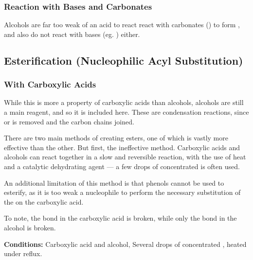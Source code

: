 
			\subsubsection{Reaction with Bases and Carbonates}

				Alcohols are far too weak of an acid to react react with carbonates () to form , and also do not
				react with bases (eg. ) either.



		\subsection{Esterification (Nucleophilic Acyl Substitution)}

			\hypertarget{EsterificationCarboxylicAcids}{}
			\subsubsection{With Carboxylic Acids}

				While this is more a property of carboxylic acids than alcohols, alcohols are still a main reagent, and so it is included here.
				These are condensation reactions, since  or  is removed and the carbon chains joined.

				There are two main methods of creating esters, one of which is vastly more effective than the other. But first, the ineffective
				method. Carboxylic acids and alcohols can react together in a slow and reversible reaction, with the use of heat and a
				catalytic dehydrating agent --- a few drops of concentrated  is often used.

				An additional limitation of this method is that phenols cannot be used to esterify, as it is too weak a nucleophile to
				perform the necessary substitution of the  on the carboxylic acid.

				To note, the  bond in the carboxylic acid is broken, while only the  bond in the alcohol is broken.

				\vspace{1.5em}
				\vbox{\textbf{Conditions:}	\tabto{35mm}Carboxylic acid and alcohol,
											\tabto{35mm}Several drops of concentrated , heated under reflux.}

